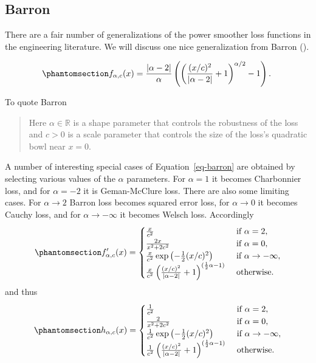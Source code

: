 \documentclass[
  12pt,
  letterpaper,
  DIV=11,
  numbers=noendperiod]{scrartcl}
\theoremstyle{definition}
\theoremstyle{plain}
\theoremstyle{plain}
\theoremstyle{plain}
\theoremstyle{definition}
\theoremstyle{remark}
\begin{document}
\subsection{Barron}\label{barron}

There are a fair number of generalizations of the power smoother loss
functions in the engineering literature. We will discuss one nice
generalization from Barron ().

\begin{equation}\phantomsection\label{eq-barron}{
f_{\alpha,c}(x)=\frac{|\alpha-2|}{\alpha}\left(\left(\frac{(x/c)^2}{|\alpha-2|}+1\right)^{\alpha/2}-1\right).\
}\end{equation}

To quote Barron

\begin{quote}
Here \(\alpha\in\mathbb{R}\) is a shape parameter that controls the
robustness of the loss and \(c>0\) is a scale parameter that controls
the size of the loss's quadratic bowl near \(x=0\).
\end{quote}

A number of interesting special cases of Equation~\ref{eq-barron} are
obtained by selecting various values of the \(\alpha\) parameters. For
\(\alpha=1\) it becomes Charbonnier loss, and for \(\alpha=-2\) it is
Geman-McClure loss. There are also some limiting cases. For
\(\alpha\rightarrow 2\) Barron loss becomes squared error loss, for
\(\alpha\rightarrow 0\) it becomes Cauchy loss, and for
\(\alpha\rightarrow-\infty\) it becomes Welsch loss. Accordingly
\begin{equation}\phantomsection\label{eq-barronf}{
f'_{\alpha,c}(x)=\begin{cases}
\frac{x}{c^2}&\text{ if }\alpha=2,\\
\frac{2x}{x^2+2c^2}&\text{ if }\alpha=0,\\
\frac{x}{c^2}\exp\left(-\frac12(x/c)^2\right)&\text{ if }\alpha\rightarrow-\infty,\\
\frac{x}{c^2}\left(\frac{(x/c)^2}{|\alpha-2|}+1\right)^{(\frac12\alpha-1)}&\text{ otherwise}.
\end{cases}
}\end{equation} and thus
\begin{equation}\phantomsection\label{eq-barronh}{
h_{\alpha,c}(x)=\begin{cases}
\frac{1}{c^2}&\text{ if }\alpha=2,\\
\frac{2}{x^2+2c^2}&\text{ if }\alpha=0,\\
\frac{1}{c^2}\exp\left(-\frac12(x/c)^2\right)&\text{ if }\alpha\rightarrow-\infty,\\
\frac{1}{c^2}\left(\frac{(x/c)^2}{|\alpha-2|}+1\right)^{(\frac12\alpha-1)}&\text{ otherwise}.
\end{cases}
}\end{equation}
\end{document}
